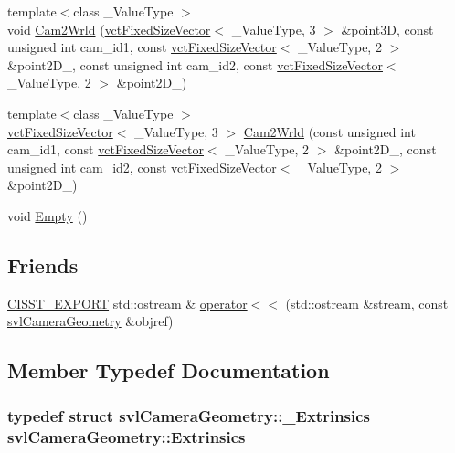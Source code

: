 \begin{DoxyCompactItemize}
{\footnotesize template$<$class \+\_\+\+Value\+Type $>$ }\\void \hyperlink{classsvl_camera_geometry_a2eec87d3959be06311e5c848f8d85dbf}{Cam2\+Wrld} (\hyperlink{classvct_fixed_size_vector}{vct\+Fixed\+Size\+Vector}$<$ \+\_\+\+Value\+Type, 3 $>$ \&point3\+D, const unsigned int cam\+\_\+id1, const \hyperlink{classvct_fixed_size_vector}{vct\+Fixed\+Size\+Vector}$<$ \+\_\+\+Value\+Type, 2 $>$ \&point2\+D\+\_, const unsigned int cam\+\_\+id2, const \hyperlink{classvct_fixed_size_vector}{vct\+Fixed\+Size\+Vector}$<$ \+\_\+\+Value\+Type, 2 $>$ \&point2\+D\+\_)
\item 
{\footnotesize template$<$class \+\_\+\+Value\+Type $>$ }\\\hyperlink{classvct_fixed_size_vector}{vct\+Fixed\+Size\+Vector}$<$ \+\_\+\+Value\+Type, 3 $>$ \hyperlink{classsvl_camera_geometry_a84e42ca7784659fa09382a5647563579}{Cam2\+Wrld} (const unsigned int cam\+\_\+id1, const \hyperlink{classvct_fixed_size_vector}{vct\+Fixed\+Size\+Vector}$<$ \+\_\+\+Value\+Type, 2 $>$ \&point2\+D\+\_, const unsigned int cam\+\_\+id2, const \hyperlink{classvct_fixed_size_vector}{vct\+Fixed\+Size\+Vector}$<$ \+\_\+\+Value\+Type, 2 $>$ \&point2\+D\+\_)
\item 
void \hyperlink{classsvl_camera_geometry_a28bcb4449a2b14f6fa821502c56070a0}{Empty} ()
\end{DoxyCompactItemize}
\subsection*{Friends}
\begin{DoxyCompactItemize}
\item 
\hyperlink{cmn_export_macros_8h_a99393e0c3ac434b2605235bbe20684f8}{C\+I\+S\+S\+T\+\_\+\+E\+X\+P\+O\+R\+T} std\+::ostream \& \hyperlink{classsvl_camera_geometry_a5edcdda0f06ca9f721b13e7e75704fec}{operator$<$$<$} (std\+::ostream \&stream, const \hyperlink{classsvl_camera_geometry}{svl\+Camera\+Geometry} \&objref)
\end{DoxyCompactItemize}


\subsection{Member Typedef Documentation}
\hypertarget{classsvl_camera_geometry_a6954baa4bd0cc3577af09e13b1c18545}{}
\subsubsection[{Extrinsics}]{\setlength{\rightskip}{0pt plus 5cm}typedef struct {\bf svl\+Camera\+Geometry\+::\+\_\+\+Extrinsics}  {\bf svl\+Camera\+Geometry\+::\+Extrinsics}}\label{classsvl_camera_geometry_a6954baa4bd0cc3577af09e13b1c18545}
\hypertarget{classsvl_camera_geometry_a864f6359614466009baca0666e6bc08e}{}
